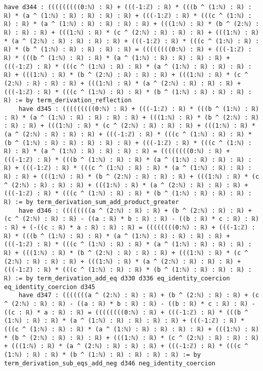 \documentclass{article}
\begin{document}
\begin{tcolorbox}[colback=white!10, width=\linewidth]
\begin{lstlisting}[language=Lean4]
    have d344 : (((((((((0:ℕ) : ℝ) + (((-1:ℤ) : ℝ) * (((b ^ (1:ℕ) : ℝ) : ℝ) * (a ^ (1:ℕ) : ℝ) : ℝ) : ℝ) : ℝ) + (((-1:ℤ) : ℝ) * (((c ^ (1:ℕ) : ℝ) : ℝ) * (a ^ (1:ℕ) : ℝ) : ℝ) : ℝ) : ℝ) + (((1:ℕ) : ℝ) * (b ^ (2:ℕ) : ℝ) : ℝ) : ℝ) + (((1:ℕ) : ℝ) * (c ^ (2:ℕ) : ℝ) : ℝ) : ℝ) + (((1:ℕ) : ℝ) * (a ^ (2:ℕ) : ℝ) : ℝ) : ℝ) : ℝ) + (((-1:ℤ) : ℝ) * (((c ^ (1:ℕ) : ℝ) : ℝ) * (b ^ (1:ℕ) : ℝ) : ℝ) : ℝ) : ℝ) = ((((((((0:ℕ) : ℝ) + (((-1:ℤ) : ℝ) * (((b ^ (1:ℕ) : ℝ) : ℝ) * (a ^ (1:ℕ) : ℝ) : ℝ) : ℝ) : ℝ) + (((-1:ℤ) : ℝ) * (((c ^ (1:ℕ) : ℝ) : ℝ) * (a ^ (1:ℕ) : ℝ) : ℝ) : ℝ) : ℝ) + (((1:ℕ) : ℝ) * (b ^ (2:ℕ) : ℝ) : ℝ) : ℝ) + (((1:ℕ) : ℝ) * (c ^ (2:ℕ) : ℝ) : ℝ) : ℝ) + (((1:ℕ) : ℝ) * (a ^ (2:ℕ) : ℝ) : ℝ) : ℝ) + (((-1:ℤ) : ℝ) * (((c ^ (1:ℕ) : ℝ) : ℝ) * (b ^ (1:ℕ) : ℝ) : ℝ) : ℝ) : ℝ) := by term_derivation_reflection
    have d345 : (((((((((0:ℕ) : ℝ) + (((-1:ℤ) : ℝ) * (((b ^ (1:ℕ) : ℝ) : ℝ) * (a ^ (1:ℕ) : ℝ) : ℝ) : ℝ) : ℝ) + (((1:ℕ) : ℝ) * (b ^ (2:ℕ) : ℝ) : ℝ) : ℝ) + (((1:ℕ) : ℝ) * (c ^ (2:ℕ) : ℝ) : ℝ) : ℝ) + (((1:ℕ) : ℝ) * (a ^ (2:ℕ) : ℝ) : ℝ) : ℝ) + (((-1:ℤ) : ℝ) * (((c ^ (1:ℕ) : ℝ) : ℝ) * (b ^ (1:ℕ) : ℝ) : ℝ) : ℝ) : ℝ) : ℝ) + (((-1:ℤ) : ℝ) * (((c ^ (1:ℕ) : ℝ) : ℝ) * (a ^ (1:ℕ) : ℝ) : ℝ) : ℝ) : ℝ) = ((((((((0:ℕ) : ℝ) + (((-1:ℤ) : ℝ) * (((b ^ (1:ℕ) : ℝ) : ℝ) * (a ^ (1:ℕ) : ℝ) : ℝ) : ℝ) : ℝ) + (((-1:ℤ) : ℝ) * (((c ^ (1:ℕ) : ℝ) : ℝ) * (a ^ (1:ℕ) : ℝ) : ℝ) : ℝ) : ℝ) + (((1:ℕ) : ℝ) * (b ^ (2:ℕ) : ℝ) : ℝ) : ℝ) + (((1:ℕ) : ℝ) * (c ^ (2:ℕ) : ℝ) : ℝ) : ℝ) + (((1:ℕ) : ℝ) * (a ^ (2:ℕ) : ℝ) : ℝ) : ℝ) + (((-1:ℤ) : ℝ) * (((c ^ (1:ℕ) : ℝ) : ℝ) * (b ^ (1:ℕ) : ℝ) : ℝ) : ℝ) : ℝ) := by term_derivation_sum_add_product_greater
    have d346 : ((((((((a ^ (2:ℕ) : ℝ) : ℝ) + (b ^ (2:ℕ) : ℝ) : ℝ) + (c ^ (2:ℕ) : ℝ) : ℝ) - ((a : ℝ) * b : ℝ) : ℝ) - ((b : ℝ) * c : ℝ) : ℝ) : ℝ) + (-((c : ℝ) * a : ℝ) : ℝ) : ℝ) = ((((((((0:ℕ) : ℝ) + (((-1:ℤ) : ℝ) * (((b ^ (1:ℕ) : ℝ) : ℝ) * (a ^ (1:ℕ) : ℝ) : ℝ) : ℝ) : ℝ) + (((-1:ℤ) : ℝ) * (((c ^ (1:ℕ) : ℝ) : ℝ) * (a ^ (1:ℕ) : ℝ) : ℝ) : ℝ) : ℝ) + (((1:ℕ) : ℝ) * (b ^ (2:ℕ) : ℝ) : ℝ) : ℝ) + (((1:ℕ) : ℝ) * (c ^ (2:ℕ) : ℝ) : ℝ) : ℝ) + (((1:ℕ) : ℝ) * (a ^ (2:ℕ) : ℝ) : ℝ) : ℝ) + (((-1:ℤ) : ℝ) * (((c ^ (1:ℕ) : ℝ) : ℝ) * (b ^ (1:ℕ) : ℝ) : ℝ) : ℝ) : ℝ) := by term_derivation_add_eq d330 d336 eq_identity_coercion eq_identity_coercion d345
    have d347 : (((((((a ^ (2:ℕ) : ℝ) : ℝ) + (b ^ (2:ℕ) : ℝ) : ℝ) + (c ^ (2:ℕ) : ℝ) : ℝ) - ((a : ℝ) * b : ℝ) : ℝ) - ((b : ℝ) * c : ℝ) : ℝ) - ((c : ℝ) * a : ℝ) : ℝ) = ((((((((0:ℕ) : ℝ) + (((-1:ℤ) : ℝ) * (((b ^ (1:ℕ) : ℝ) : ℝ) * (a ^ (1:ℕ) : ℝ) : ℝ) : ℝ) : ℝ) + (((-1:ℤ) : ℝ) * (((c ^ (1:ℕ) : ℝ) : ℝ) * (a ^ (1:ℕ) : ℝ) : ℝ) : ℝ) : ℝ) + (((1:ℕ) : ℝ) * (b ^ (2:ℕ) : ℝ) : ℝ) : ℝ) + (((1:ℕ) : ℝ) * (c ^ (2:ℕ) : ℝ) : ℝ) : ℝ) + (((1:ℕ) : ℝ) * (a ^ (2:ℕ) : ℝ) : ℝ) : ℝ) + (((-1:ℤ) : ℝ) * (((c ^ (1:ℕ) : ℝ) : ℝ) * (b ^ (1:ℕ) : ℝ) : ℝ) : ℝ) : ℝ) := by term_derivation_sub_eqs_add_neg d346 neg_identity_coercion

\end{lstlisting}
\end{tcolorbox}
\end{document}
